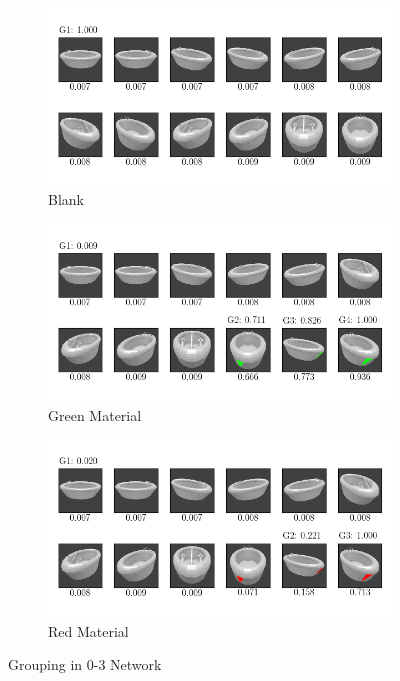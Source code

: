 \begin{figure}
	\centering
	\begin{subfigure}{\textwidth}
		\includegraphics[trim=10 20 10 20, clip]{images/mn-sl-0-3-20/bathtub_0107_0_grouping.png}
		\caption{Blank}
		\label{fig:grouping-0-3-blank}
	\end{subfigure}
	\begin{subfigure}{\textwidth}
		\includegraphics[trim=10 20 10 20, clip]{images/mn-sl-0-3-20/bathtub_0107_1_grouping.png}
		\caption{Green Material}
		\label{fig:grouping-0-3-green}
	\end{subfigure}
	\begin{subfigure}{\textwidth}
		\includegraphics[trim=10 20 10 20, clip]{images/mn-sl-0-3-20/bathtub_0107_2_grouping.png}
		\caption{Red Material}
		\label{fig:grouping-0-3-red}
	\end{subfigure}
	\caption[Grouping in 0-3 Network]{Grouping in 0-3 Network}
	\label{fig:grouping-0-3}
\end{figure}
